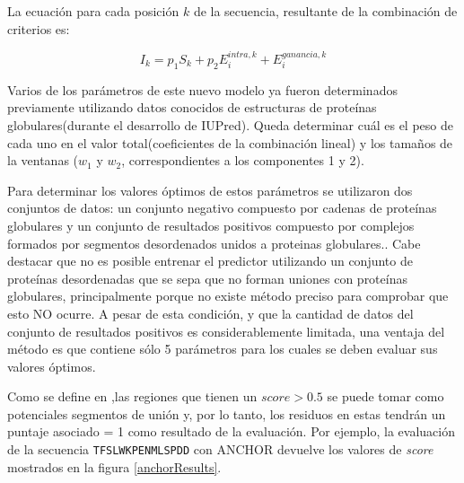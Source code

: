 La ecuación para cada posición $k$ de la secuencia, resultante de la combinación de criterios es:

\begin{equation}\label{scorefinal}
I_k = p_1S_k + p_2E_i^{intra,k} + E_i^{ganancia,k}
\end{equation}


Varios de los parámetros de este nuevo modelo ya fueron determinados previamente utilizando datos conocidos de estructuras de proteínas globulares(durante el desarrollo de IUPred).
Queda determinar cuál es el peso de cada uno en el valor total(coeficientes de la combinación lineal) y los tamaños de la ventanas ($w_1$ y $w_2$, correspondientes a los componentes 1 y 2).

Para determinar los valores óptimos de estos parámetros se utilizaron dos conjuntos de datos: un conjunto negativo compuesto por cadenas de proteínas globulares y un conjunto de resultados positivos compuesto por complejos formados por segmentos desordenados unidos a proteinas globulares..
Cabe destacar que no es posible entrenar el predictor utilizando un conjunto de proteínas desordenadas que se sepa que no forman uniones con proteínas globulares, 
principalmente porque no existe método preciso para comprobar que esto NO ocurre. 
A pesar de esta condición, y que la cantidad de datos del conjunto de resultados positivos es considerablemente limitada, una ventaja del método es que contiene sólo 5 parámetros para los cuales se deben evaluar sus valores óptimos. 


Como se define en \cite{dosztanyi2009anchor},las regiones que tienen un $score>0.5$ se puede tomar como potenciales segmentos de unión y, por lo tanto, los residuos en estas tendrán un puntaje asociado = 1 como resultado de la evaluación.
Por ejemplo, la evaluación de la secuencia \texttt{TFSLWKPENMLSPDD} con ANCHOR devuelve los valores de \textit{score} mostrados en la figura \ref{anchorResults}. 

